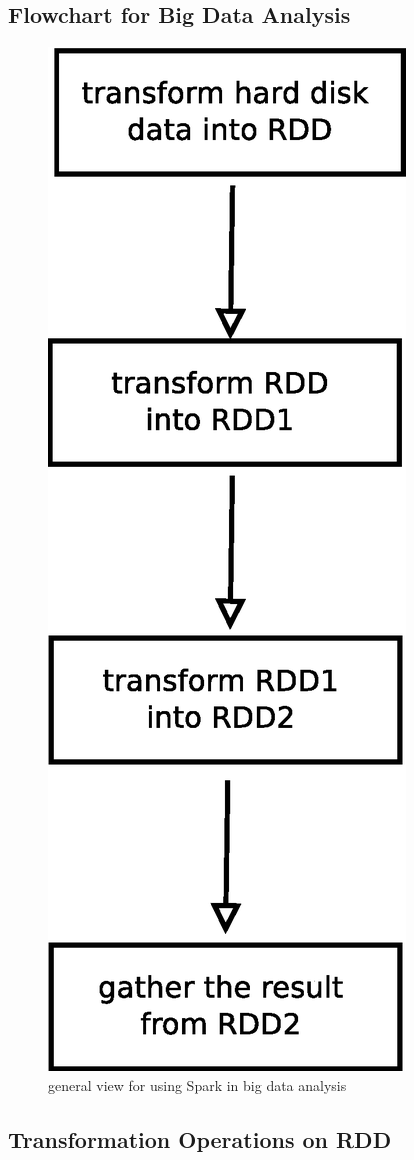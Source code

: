 \documentclass[notheorems, aspectratio=54]{beamer}
\begin{document}

\subsection{Flowchart for Big Data Analysis}
\begin{frame}

 \begin{figure}
 \includegraphics[scale=0.3]{rdd2}
\caption{general view for using Spark in big data analysis}
\end{figure} 

\end{frame}



\subsection{Transformation Operations on RDD}
\begin{frame}




\end{frame}
\end{document}
